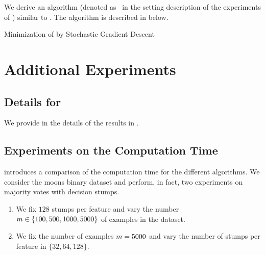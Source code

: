 \begin{noaddcontents}
We derive an algorithm (denoted as \algogermain\ in the setting description of the experiments of ) similar to .
The algorithm is described in  below.
\begin{algorithm}[h!]
 \caption{Minimization of  by Stochastic Gradient Descent}
  \begin{algorithmic}
  
    \State{$\Q \leftarrow \P$}
    \EndFor
    \EndFor 
  \end{algorithmic}
  \label{ap:mv:algo:2-gibbs}
\end{algorithm}

\section{Additional Experiments}

\subsection{Details for }
\label{ap:mv:sec:details}

We provide in  the details of the results in .

\subsection{Experiments on the Computation Time}
\label{ap:mv:sec:time}

 introduces a comparison of the computation time for the different algorithms.
We consider the moons binary dataset and perform, in fact, two experiments on majority votes with decision stumps.
\begin{enumerate}[label={\it (\roman*)}]
    \item We fix $128$ stumps per feature and vary the number $m\in\{100, 500, 1000, 5000\}$ of examples in the dataset.
    \item We fix the number of examples $m = 5000$ and vary the number of stumps per feature in $\{32, 64, 128\}$.
\end{enumerate}


\end{noaddcontents}
